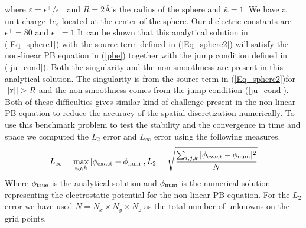 where $\varepsilon=\epsilon^+ / \epsilon^-$ and $R=2$\AA \text{ }is the radius of the sphere and $\bar{\kappa}=1$. We have a unit charge $1e_c$ located at the center of the sphere. Our dielectric constants are $\epsilon^+=80$ and $\epsilon^-=1$ It can be shown that this analytical solution in (\ref{Eq_sphere1}) with the source term defined in (\ref{Eq_sphere2}) will satisfy the non-linear PB equation in (\ref{pbe}) together with the jump condition defined in (\ref{ju_cond}). Both the singularity and the non-smoothness are present in this analytical solution. The singularity is from the source term in (\ref{Eq_sphere2})for $||{\bf r}|| >R$ and the non-smoothness comes from the jump condition (\ref{ju_cond}). Both of these difficulties gives similar kind of challenge present in the non-linear PB equation to reduce the accuracy of the spatial discretization numerically. To use this benchmark problem to test the stability and the convergence in time and space we computed the $L_2$ error and $L_\infty$ error using the following measures. 
$$L_\infty=\max\limits_{i,j,k}|\phi_{\rm exact}-\phi_{\rm num}|, L_2 = \sqrt{\frac{\sum_{i,j,k}|\phi_{\rm exact}-\phi_{\rm num}|^2}{N}}$$
Where $\phi_{\rm true}$ is the analytical solution and $\phi_{\rm num}$ is the numerical solution representing the electrostatic potential for the non-linear PB equation. For the $L_2$ error we have used $N= N_x \times N_y \times N_z$ as the total number of unknowns on the grid points. 



 
 
